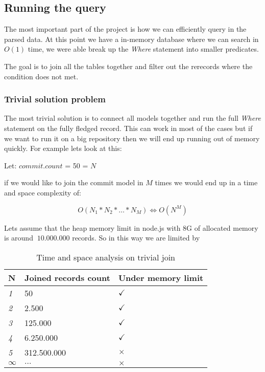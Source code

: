 \subsection{Running the query}

The most important part of the project is how we can efficiently query in the parsed data. At this point we have a in-memory database where we can search in \(O(1)\) time, we were able break up the \textit{Where} statement into smaller predicates.

The goal is to join all the tables together and filter out the rerecords where the condition does not met.

\subsubsection{Trivial solution problem}
The most trivial solution is to connect all models together and run the full \textit{Where} statement on the fully fledged record. This can work in most of the cases but if we want to run it on a big repository then we will end up running out of memory quickly. For example lets look at this:

Let: $commit.count$ = 50 = $N$

if we would like to join the commit model in $M$ times we would end up in a time and space complexity of:

\[ O(N_1 * N_2 * \dots * N_M ) \Leftrightarrow O(N^M) \]

Lets assume that the heap memory limit in node.js with 8G of allocated memory is around $~10.000.000$ records. So in this way we are limited by

\begin{table}[H]
	\centering
	\begin{tabular}{ | m{} | m{} | m{} | }
		\hline
		\textbf{N} & \textbf{Joined records count} & \textbf{Under memory limit} \\
		\hline \hline
		\emph{1} & 50 & $\checkmark$ \\
		\hline
		\emph{2} & 2.500 & $\checkmark$ \\
		\hline
		\emph{3} & 125.000 & $\checkmark$ \\
		\hline
		\emph{4} & 6.250.000 & $\checkmark$ \\
		\hline
		\emph{5} & 312.500.000 & $\times$ \\
		\hline
		\emph{$\infty$} & $\dots$ & $\times$ \\
		\hline
	\end{tabular}
	\caption{Time and space analysis on trivial join}
	\label{tab:tsj-1}
\end{table}


